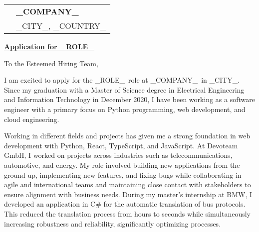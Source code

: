 \documentclass[10pt, a4paper]{article}
\begin{document}
\vspace{2.5cm}
\bigskip
\bigskip



\newcommand{\COMPANY}{_COMPANY_}
\newcommand{\ROLE}{_ROLE_}
\newcommand{\JobPostingURL}{_URL_}
\newcommand{\CITY}{_CITY_}
\newcommand{\COUNTRY}{_COUNTRY_}

\begin{tabular}{@{}p{0cm}l@{}} 
 & \textbf{\COMPANY} \\[0.8ex] 
 & \CITY, \COUNTRY
\end{tabular}

\bigskip %

\hfill {}

\noindent \textbf{\underline{Application for \href{\JobPostingURL}{\ROLE}}}


To the Esteemed Hiring Team,
\bigskip

I am excited to apply for the \ROLE\ role at \COMPANY\ in \CITY. Since my graduation with a Master of Science degree in Electrical Engineering and Information Technology in December 2020, I have been working as a software engineer with a primary focus on Python programming, web development, and cloud engineering.

Working in different fields and projects has given me a strong foundation in web development with Python, React, TypeScript, and JavaScript. At Devoteam GmbH, I worked on projects across industries such as telecommunications, automotive, and energy. My role involved building new applications from the ground up, implementing new features, and fixing bugs while collaborating in agile and international teams and maintaining close contact with stakeholders to ensure alignment with business needs. During my master's internship at BMW, I developed an application in C\# for the automatic translation of bus protocols. This reduced the translation process from hours to seconds while simultaneously increasing robustness and reliability, significantly optimizing processes.
\end{document}
